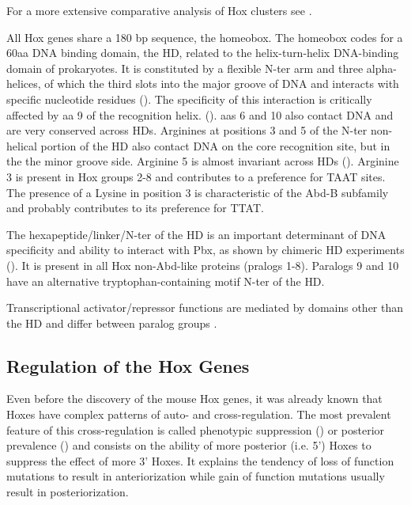 For a more extensive comparative analysis of Hox clusters see \cite{Duboule2007}.

All Hox genes share a 180 bp sequence, the homeobox. The homeobox codes for a 60aa DNA binding domain, the \ac{HD}, related to the helix-turn-helix DNA-binding domain of prokaryotes. It is constituted by a flexible \ac{N-ter} arm and three alpha-helices, of which the third slots into the major groove of DNA and interacts with specific nucleotide residues (\cite{Treisman1992}). The specificity of this interaction is critically affected by \ac{aa} 9 of the recognition helix. (\cite{Treisman1992}). \acp{aa} 6 and 10 also contact DNA and are very conserved across \acp{HD}. Arginines at positions 3 and 5 of the \ac{N-ter} non-helical portion of the \ac{HD} also contact DNA on the core recognition site, but in the the minor groove side. Arginine 5 is almost invariant across \acp{HD} (\cite{Treisman1992}). Arginine 3 is present in Hox groups 2-8 and contributes to a preference for TAAT sites. The presence of a Lysine in position 3 is characteristic of the \ac{Abd-B} subfamily and probably contributes to its preference for TTAT.

The hexapeptide/linker/\ac{N-ter} of the \ac{HD} is an important determinant of DNA specificity and ability to interact with Pbx, as shown by chimeric \ac{HD} experiments (\cite{Chang1996,Phelan1997}). It is present in all Hox non-Abd-like proteins (pralogs 1-8). Paralogs 9 and 10 have an alternative tryptophan-containing motif \ac{N-ter} of the \ac{HD}.

Transcriptional activator/repressor functions are mediated by domains other than the \ac{HD} and differ between paralog groups \cite{ref}.

\subsection{Regulation of the Hox Genes}

Even before the discovery of the mouse Hox genes, it was already known that Hoxes have complex patterns of auto- and cross-regulation. The most prevalent feature of this cross-regulation is called phenotypic suppression (\cite{Gonzalez-Reyes1990}) or posterior prevalence (\cite{Lufkin1991}) and consists on the ability of more posterior (i.e. 5') Hoxes to suppress the effect of more 3' Hoxes. It explains the tendency of loss of function mutations to result in anteriorization while gain of function mutations usually result in posteriorization.

